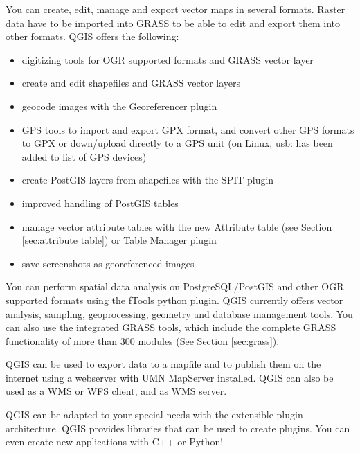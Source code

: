 
You can create, edit, manage and export vector maps in several formats. Raster data
have to be imported into GRASS to be able to edit and export them into other
formats. QGIS offers the following: 

\begin{itemize}
\item digitizing tools for OGR supported formats and GRASS vector layer
\item create and edit shapefiles and GRASS vector layers
\item geocode images with the Georeferencer plugin
\item GPS tools to import and export GPX format, and convert other GPS
formats to GPX or down/upload directly to a GPS unit (on Linux, usb: has been added 
to list of GPS devices)
\item create PostGIS layers from shapefiles with the SPIT plugin 
\item improved handling of PostGIS tables
\item manage vector attribute tables with the new Attribute table (see Section 
\ref{sec:attribute table}) or Table Manager plugin
\item save screenshots as georeferenced images
\end{itemize}


You can perform spatial data analysis on PostgreSQL/PostGIS and other OGR
supported formats using the fTools python plugin. QGIS currently offers
vector analysis, sampling, geoprocessing, geometry and database management
tools. You can also use the integrated GRASS tools, which 
include the complete GRASS functionality of more than 300 modules (See
Section \ref{sec:grass}).


QGIS can be used to export data to a mapfile and to publish them on the
internet using a webserver with UMN MapServer installed. QGIS can also
be used as a WMS or WFS client, and as WMS server. 


QGIS can be adapted to your special needs with the extensible
plugin architecture. QGIS provides libraries that can be used to create
plugins.  You can even create new applications with C++ or Python!

